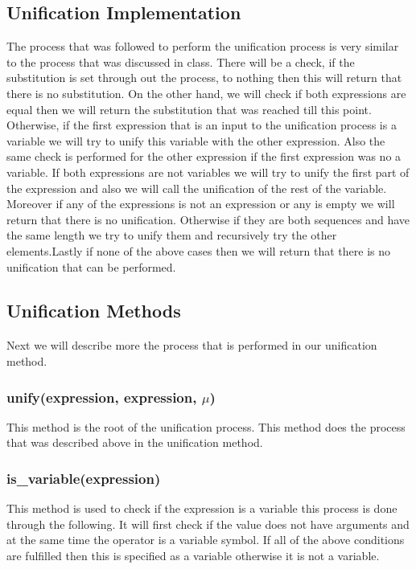 {\subsection{Unification Implementation}\label{unificationMethod}
The process that was followed to perform the unification process is very similar to the process that was discussed in class. There will be a check, if the substitution is set through out the process, to nothing then this will return that there is no substitution. On the other hand, we will check if both expressions are equal then we will return the substitution that was reached till this point. Otherwise, if the first expression that is an input to the unification process is a variable we will try to unify this variable with the other expression. Also the same check is performed for the other expression if the first expression was no a variable. If both expressions are not variables we will try to unify the first part of the expression and also we will call the unification of the rest of the variable. Moreover if any of the expressions is not an expression or any is empty we will return that there is no unification. Otherwise if they are both sequences and have the same length we try to unify them and recursively try the other elements.Lastly if none of the above cases then we will return that there is no unification that can be performed.
\subsection{Unification Methods}
\paragraph*{}
Next we will describe more the process that is performed in our unification method.
\subsubsection{unify(expression, expression, $\mu$)}
This method is the root of the unification process. This method does the process that was described above in the unification method.
\subsubsection{is\_variable(expression)}
This method is used to check if the expression is a variable this process is done through the following. It will first check if the value does not have arguments and at the same time the operator is a variable symbol. If all of the above conditions are fulfilled then this is specified as a variable otherwise it is not a variable.
}

